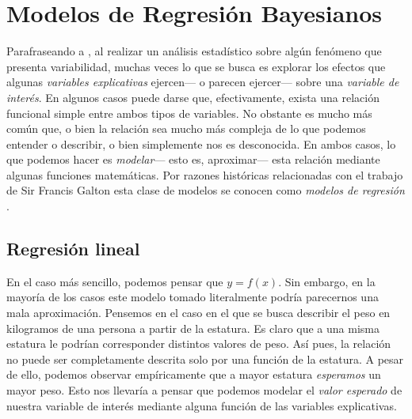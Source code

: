 \chapter{Modelos de Regresión Bayesianos}

Parafraseando a \textcite[15-16]{DraperSmith98}, al realizar un análisis estadístico sobre algún fenómeno que presenta variabilidad, muchas veces lo que se busca es explorar los efectos que algunas \textit{variables explicativas} ejercen--- o parecen ejercer--- sobre una \textit{variable de interés}. En algunos casos puede darse que, efectivamente, exista una relación funcional simple entre ambos tipos de variables. No obstante es mucho más común que, o bien la relación sea mucho más compleja de lo que podemos entender o describir, o bien simplemente nos es desconocida. En ambos casos, lo que podemos hacer es \textit{modelar}--- esto es, aproximar--- esta relación mediante algunas funciones matemáticas. Por razones históricas relacionadas con el trabajo de Sir Francis Galton esta clase de modelos se conocen como \textit{modelos de regresión} \parencite[28]{Zepeda15}. 

\section{Regresión lineal} 
 
En el caso más sencillo, podemos pensar que $y=f(x)$. Sin embargo, en la mayoría de los casos este modelo tomado literalmente podría parecernos una mala aproximación. Pensemos en el caso en el que se busca describir el peso en kilogramos de una persona a partir de la estatura. Es claro que a una misma estatura le podrían corresponder distintos valores de peso. Así pues, la relación no puede ser completamente descrita solo por una función de la estatura. A pesar de ello, podemos observar empíricamente que a mayor estatura \textit{esperamos} un mayor peso. Esto nos llevaría a pensar que podemos modelar el \textit{valor esperado} de nuestra variable de interés mediante alguna función de las variables explicativas.\\

